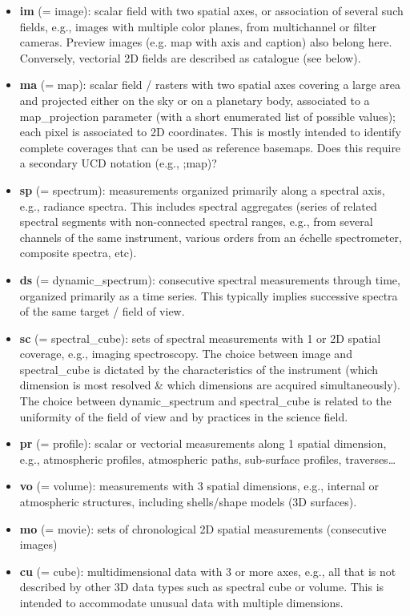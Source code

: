 \documentclass[11pt,a4paper]{ivoa}
\begin{document}
\begin{itemize}
\item \textbf{im }(= image): scalar field with two spatial axes, or association of several such fields, e.g., images with multiple color planes, from multichannel or filter cameras. Preview images (e.g. map with axis and caption) also belong here. Conversely, vectorial 2D fields are described as catalogue (see below).
\item \textbf{ma }(= map): scalar field / rasters with two spatial axes covering a large area and projected either on the sky or on a planetary body, associated to a map\_projection parameter (with a short enumerated list of possible values); each pixel is associated to 2D coordinates. This is mostly intended to identify complete coverages that can be used as reference basemaps. Does this require a secondary UCD notation (e.g., ;map)?
\item \textbf{sp }(= spectrum): measurements organized primarily along a spectral axis, e.g., radiance spectra. This includes spectral aggregates (series of related spectral segments with non-connected spectral ranges, e.g., from several channels of the same instrument, various orders from an échelle spectrometer, composite spectra, etc).
\item \textbf{ds }(= dynamic\_spectrum): consecutive spectral measurements through time, organized primarily as a time series. This typically implies successive spectra of the same target / field of view.
\item \textbf{sc }(= spectral\_cube): sets of spectral measurements with 1 or 2D spatial coverage, e.g., imaging spectroscopy. The choice between image and spectral\_cube is dictated by the characteristics of the instrument (which dimension is most resolved \& which dimensions are acquired simultaneously). The choice between dynamic\_spectrum and spectral\_cube is related to the uniformity of the field of view and by practices in the science field.
\item \textbf{pr }(= profile): scalar or vectorial measurements along 1 spatial dimension, e.g., atmospheric profiles, atmospheric paths, sub-surface profiles, traverses…
\item \textbf{vo }(= volume): measurements with 3 spatial dimensions, e.g., internal or atmospheric structures, including shells/shape models (3D surfaces).
\item \textbf{mo }(= movie): sets of chronological 2D spatial measurements (consecutive images)
\item \textbf{cu }(= cube): multidimensional data with 3 or more axes, e.g., all that is not described by other 3D data types such as spectral cube or volume. This is intended to accommodate unusual data with multiple dimensions.

\end{itemize}
\end{document}

